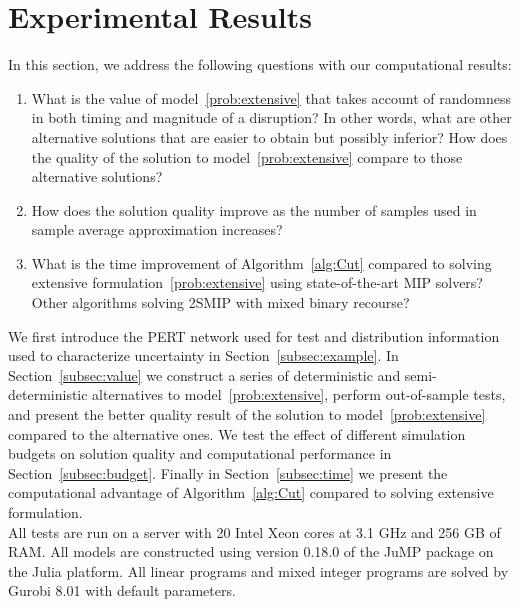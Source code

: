 \documentclass[11pt]{article}
\begin{document}
	\section{Experimental Results} \label{sec:results}
	In this section, we address the following questions with our computational results:
	\begin{enumerate}
		\item What is the value of model~\eqref{prob:extensive} that takes account of randomness in both timing and magnitude of a disruption? In other words, what are other alternative solutions that are easier to obtain but possibly inferior? How does the quality of the solution to model~\eqref{prob:extensive} compare to those alternative solutions?
		\item How does the solution quality improve as the number of samples used in sample average approximation increases? 
		\item What is the time improvement of Algorithm~\ref{alg:Cut} compared to solving extensive formulation~\eqref{prob:extensive} using state-of-the-art MIP solvers? Other algorithms solving 2SMIP with mixed binary recourse?
	\end{enumerate}
	We first introduce the PERT network used for test and distribution information used to characterize uncertainty in Section~\ref{subsec:example}. In Section~\ref{subsec:value} we construct a series of deterministic and semi-deterministic alternatives to model~\eqref{prob:extensive}, perform out-of-sample tests, and present the better quality result of the solution to model~\eqref{prob:extensive} compared to the alternative ones. We test the effect of different simulation budgets on solution quality and computational performance in Section~\ref{subsec:budget}. Finally in Section~\ref{subsec:time} we present the computational advantage of Algorithm~\ref{alg:Cut} compared to solving extensive formulation.\\
	\newline
	All tests are run on a server with 20 Intel Xeon cores at 3.1 GHz and 256 GB of RAM. All models are constructed using version 0.18.0 of the JuMP package \cite{DunningHuchetteLubin2017} on the Julia platform. All linear programs and mixed integer programs are solved by Gurobi 8.01 \cite{gurobi2016} with default parameters.
	
\end{document}
